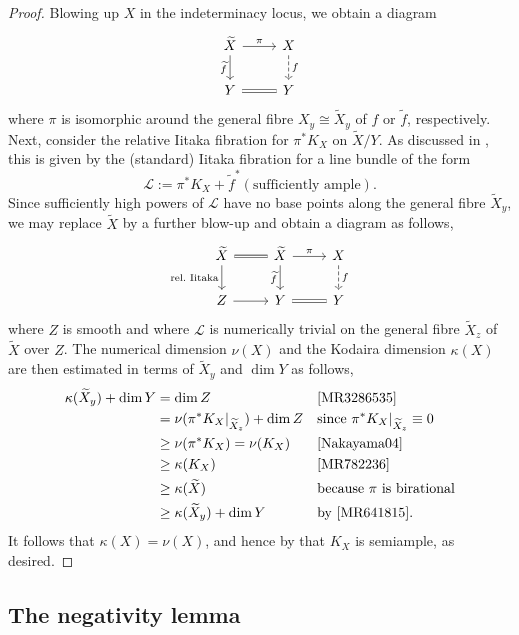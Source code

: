 \documentclass[JEP,XML,SOM,Unicode,published]{cedram}
\let\scr\mathscr
\let\ts\relax
\theoremstyle{plain}
\theoremstyle{definition}
\numberwithin{equation}{thm}
\numberwithin{enumi}{thm}
\newcommand{\sL}{\scr{L}}
\let\wtilde\widetilde
\begin{document}
\begin{proof}
Blowing up $X$ in the indeterminacy locus, we obtain a diagram
\[
\begin{tikzcd}
\wtilde{X} \ar[r, "\ts\pi"] \ar[d, "\ts\wtilde{f}"'] & X \ar[d, dashed, "\ts f"] \\
Y \ar[r, equal] & Y
\end{tikzcd}
\]
where $\pi$ is isomorphic around the general fibre $X_y \cong \wtilde{X}_y$ of $f$
or $\wtilde{f}$, respectively. Next, consider the relative Iitaka fibration
for $\pi^* K_X$ on $\wtilde{X}/Y$. As discussed in \cite[\S 2.4]{MR3286535},
this is given by the (standard) Iitaka fibration for a line bundle of the form
\[
\sL := \pi^* K_X + \wtilde{f}^*(\text{sufficiently ample}).
\]
Since sufficiently high powers of $\sL$ have no base points along the general
fibre $\wtilde{X}_y$, we may replace $\wtilde{X}$ by a further blow-up and
obtain a diagram as follows,
\[
\begin{tikzcd}
\wtilde{X} \ar[r, equal] \ar[d, "\ts\text{rel.~Iitaka}"'] & \wtilde{X} \ar[r, "\ts\pi"] \ar[d, "\ts\wtilde{f}"'] & X \ar[d, dashed, "\ts f"] \\
Z \ar[r] & Y \ar[r, equal] & Y
\end{tikzcd}
\]
where $Z$ is smooth and where $\sL$ is numerically trivial on the general fibre
$\wtilde{X}_z$ of $\wtilde{X}$ over $Z$. The numerical dimension $\nu(X)$ and
the Kodaira dimension $\kappa(X)$ are then estimated in terms of $\wtilde{X}_y$ and
$\dim Y$ as follows,
\begin{align*}
\kappa(\wtilde{X}_y) + \dim Y & = \dim Z && \text{\cite[\S 2.4]{MR3286535}} \\
& = \nu(\pi^*K_X|_{\wtilde{X}_z}) + \dim Z && \text{since } \pi^*K_X|_{\wtilde{X}_z} \equiv 0\\
& \geq \nu(\pi^* K_X) = \nu(K_X) && \text{\cite[V.~Lem.\,2.3.(2)]{Nakayama04}} \\
& \geq \kappa(K_X) && \text{\cite[Prop.\,2.2]{MR782236}} \\
& \geq \kappa(\wtilde{X}) && \text{because $\pi$ is birational}\\
& \geq \kappa(\wtilde{X}_y) + \dim Y && \text{by \cite[Satz~III]{MR641815}}.
\end{align*}
It follows that $\kappa(X) = \nu(X)$, and hence by \cite[Cor.\,6-1-13]{KMM87} that
$K_X$ is semiample, as desired.
\end{proof}

\subsection{The negativity lemma}
\end{document}
